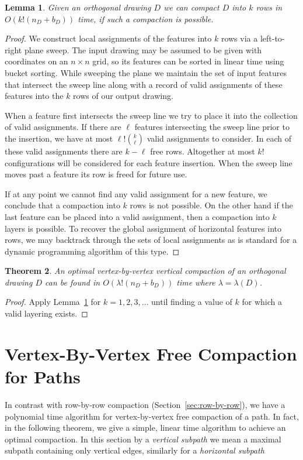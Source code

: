 \documentclass[12pt]{article}
\newtheorem{theorem}{Theorem}
\newtheorem{lemma}[theorem]{Lemma}
\theoremstyle{definitions}
\begin{document}
\begin{lemma}
\label{lem:fpt-fixed-num-of-layers}
Given an orthogonal drawing $D$ we can  compact $D$ into $k$ rows
in $O(k!(n_D+b_D))$ time, if such a compaction is possible.
\end{lemma}
\begin{proof}
We construct local assignments of the features into $k$ rows via a left-to-right plane sweep. The input drawing may be assumed to be given with coordinates on an $n\times n$ grid, so its features can be sorted in linear time using bucket sorting. While sweeping the plane we maintain the set of input features that intersect the sweep line along with a record of valid assignments of these features into the $k$ rows of our output drawing.

When a feature first intersects the sweep line we try to place it into the collection of valid assignments. If there are $\ell$ features intersecting the sweep line prior to the insertion, we have at most $\ell!\binom{k}{\ell}$ valid assignments to consider. In each of these valid assignments there are $k - \ell$ free rows. Altogether at most $k!$ configurations will be considered for each feature insertion. When the sweep line moves past a feature its row is freed for future use.

If at any point we cannot find any valid assignment for a new feature, we conclude that a compaction into $k$ rows is not possible. On the other hand if the last feature can be placed into a valid assignment, then a compaction into $k$ layers is possible. To recover the global assignment of horizontal features into rows, we may backtrack through the sets of  local assignments as is standard for a dynamic programming algorithm of this type.
\end{proof}

\begin{theorem}
An optimal vertex-by-vertex vertical compaction of an orthogonal drawing $D$ can be found in $O(\lambda!(n_D+b_D))$ time where $\lambda = \lambda(D)$.
\end{theorem}

\begin{proof}
Apply Lemma~\ref{lem:fpt-fixed-num-of-layers} for $k=1,2,3,\dots$ until finding a value of $k$ for which a valid layering exists.
\end{proof}

\section{Vertex-By-Vertex Free Compaction for Paths}
In contrast with row-by-row compaction (Section~\ref{sec:row-by-row}), we have a polynomial time algorithm for
vertex-by-vertex free compaction of a path. In fact, in the following theorem,
we give a simple, linear time algorithm to achieve an optimal compaction. In this section by a \emph{vertical subpath} we mean a maximal subpath containing only vertical edges, similarly for a \emph{horizontal subpath}
\end{document}
